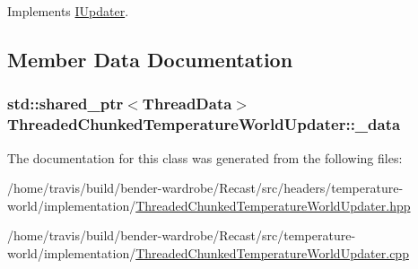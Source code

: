Implements \hyperlink{class_i_updater_a08a8af34922a2320f5ab5617e6e31276}{I\-Updater}.



\subsection{Member Data Documentation}
\hypertarget{class_threaded_chunked_temperature_world_updater_ac1ccf89503ccb9f4aea1437188246503}{
\subsubsection[{\-\_\-data}]{\setlength{\rightskip}{0pt plus 5cm}std\-::shared\-\_\-ptr$<${\bf Thread\-Data}$>$ Threaded\-Chunked\-Temperature\-World\-Updater\-::\-\_\-data\hspace{0.3cm}{\ttfamily [protected]}}}\label{class_threaded_chunked_temperature_world_updater_ac1ccf89503ccb9f4aea1437188246503}


The documentation for this class was generated from the following files\-:\begin{DoxyCompactItemize}
\item 
/home/travis/build/bender-\/wardrobe/\-Recast/src/headers/temperature-\/world/implementation/\hyperlink{_threaded_chunked_temperature_world_updater_8hpp}{Threaded\-Chunked\-Temperature\-World\-Updater.\-hpp}\item 
/home/travis/build/bender-\/wardrobe/\-Recast/src/temperature-\/world/implementation/\hyperlink{_threaded_chunked_temperature_world_updater_8cpp}{Threaded\-Chunked\-Temperature\-World\-Updater.\-cpp}\end{DoxyCompactItemize}
